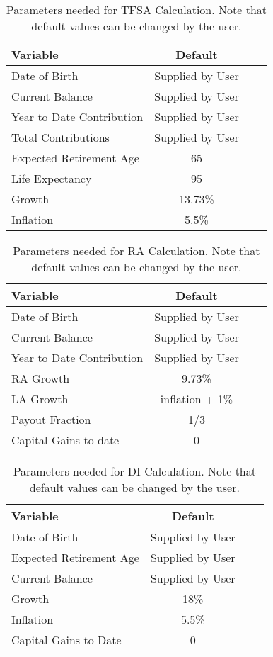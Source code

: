 \documentclass[a4paper, justified]{tufte-handout}
\begin{document}
\begin{table}[tb]
	\centering
	\caption{Parameters needed for TFSA Calculation. Note that default values can be changed by the user.}
	\label{tab:TFSAParameters}
	\begin{tabular}{lccc}
		\toprule
		\textbf{Variable} 												& \textbf{Default} \\ 
		\midrule
		Date of Birth 										&  Supplied by User\\ 
		Current Balance 								&  Supplied by User\\ 
		Year to Date Contribution							&  Supplied by User\\ 
		Total Contributions						&  Supplied by User\\ 
		Expected Retirement Age	&  65\\ 
		Life Expectancy										&95\\
		Growth												&13.73\%\\
		Inflation													&5.5\%\\
		\bottomrule
	\end{tabular}
\end{table}

\begin{table}[bt]
	\centering
	\caption{Parameters needed for RA Calculation. Note that default values can be changed by the user.}
	\label{tab:RAParameters}
	\begin{tabular}{lccc}
		\toprule
		\textbf{Variable} 												& \textbf{Default} \\ 
		\midrule
		Date of Birth 										&  Supplied by User\\ 
		Current Balance 								&  Supplied by User\\ 
		Year to Date Contribution							&  Supplied by User\\ 
		RA Growth						&  9.73\%\\ 
		LA Growth	&  inflation + 1\%\\ 
		Payout Fraction									&1/3\\
		Capital Gains to date & 0\\
		\bottomrule
	\end{tabular}
\end{table}

\begin{table}[b]
	\centering
	\caption{Parameters needed for DI Calculation. Note that default values can be changed by the user.}
	\label{tab:DIParameters}
	\begin{tabular}{lccc}
		\toprule
		\textbf{Variable} 												& \textbf{Default} \\ 
		\midrule
		Date of Birth 										&  Supplied by User\\ 
		Expected Retirement Age 				& Supplied by User\\
		Current Balance								&  Supplied by User\\ 
		Growth						&  18\%\\ 
		Inflation									&5.5\%\\
		Capital Gains to Date & 0\\
		\bottomrule
	\end{tabular}
\end{table}
\end{document}
